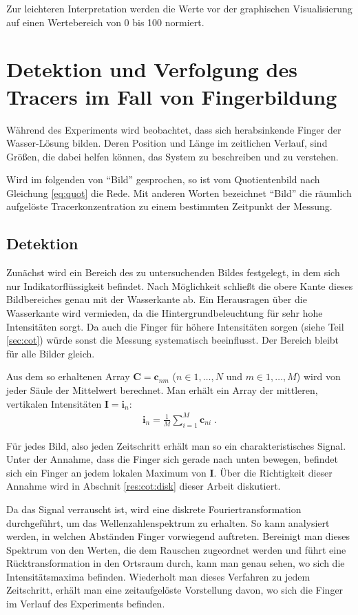 Zur leichteren Interpretation werden die Werte vor der graphischen Visualisierung auf einen Wertebereich von 0 bis 100 normiert.

\section{Detektion und Verfolgung des Tracers im Fall von Fingerbildung}
\label{sec:track}
Während des \COTm Experiments wird beobachtet, dass sich herabsinkende Finger der Wasser-\COTm Lösung bilden. Deren Position und Länge im zeitlichen Verlauf, sind  Größen, die dabei helfen können, das System zu beschreiben und zu verstehen.

Wird im folgenden von "`Bild"' gesprochen, so ist vom Quotientenbild nach Gleichung \ref{eq:quot} die Rede. Mit anderen Worten bezeichnet "`Bild"' die räumlich aufgelöste Tracerkonzentration zu einem bestimmten Zeitpunkt der Messung.

\subsection{Detektion}
\label{sec:dec}
Zunächst wird ein Bereich des zu untersuchenden Bildes festgelegt, in dem sich nur Indikatorflüssigkeit befindet. Nach Möglichkeit schließt die obere Kante dieses Bildbereiches genau mit der Wasserkante ab. Ein Herausragen über die Wasserkante wird vermieden, da die Hintergrundbeleuchtung für sehr hohe Intensitäten sorgt. Da auch die Finger für höhere Intensitäten sorgen (siehe Teil \ref{sec:cot}) würde sonst die Messung systematisch beeinflusst. Der Bereich bleibt für alle Bilder gleich.

Aus dem so erhaltenen Array $\mathbf{C} = \mathbf{c}_{nm}$ ($n \in 1,\dots,N$ und $m \in 1,\dots,M$) wird von jeder Säule der Mittelwert berechnet. Man erhält ein Array der mittleren, vertikalen Intensitäten $\mathbf{I} = \mathbf{i}_{n}$:
\begin{eqnarray}
 \mathbf{i}_{n} = \frac{1}{M} \sum_{i=1}^{M} \mathbf{c}_{ni} \; .
\end{eqnarray}

Für jedes Bild, also jeden Zeitschritt erhält man so ein charakteristisches Signal. Unter der Annahme, dass die Finger sich gerade nach unten bewegen, befindet sich ein Finger an jedem lokalen Maximum von $\mathbf{I}$. Über die Richtigkeit dieser Annahme wird in Abschnit \ref{res:cot:disk} dieser Arbeit diskutiert. 

Da das Signal verrauscht ist, wird eine diskrete Fouriertransformation durchgeführt, um das Wellenzahlenspektrum zu erhalten. So kann analysiert werden, in welchen Abständen Finger vorwiegend auftreten. Bereinigt man dieses Spektrum von den Werten, die dem Rauschen zugeordnet werden und führt eine Rücktransformation in den Ortsraum durch, kann man genau sehen, wo sich die Intensitätsmaxima befinden. Wiederholt man dieses Verfahren zu jedem Zeitschritt, erhält man eine zeitaufgelöste Vorstellung davon, wo sich die Finger im Verlauf des Experiments befinden.

